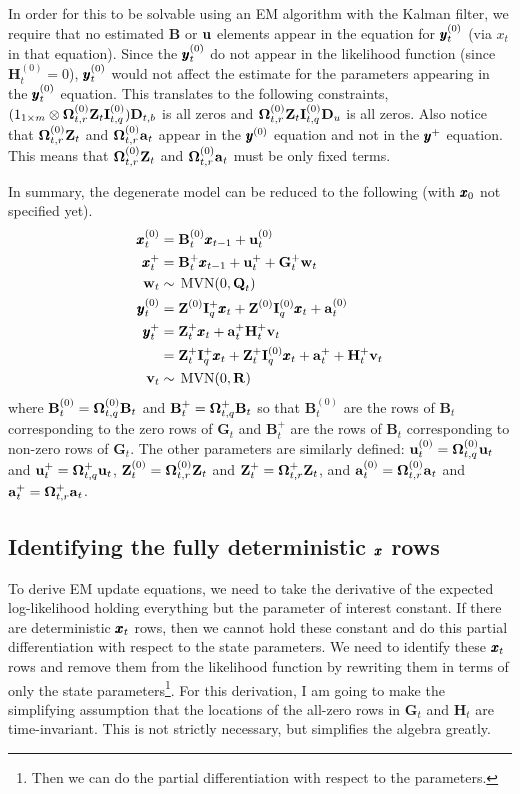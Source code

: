 \documentclass[]{article}
\def\OMG{\mbox{\boldmath $\Omega$}}
\def\UPS{\mbox{\boldmath $\Upsilon$}}
\def\XI{\mbox{\boldmath $\Xi$}}
\def\BB{\mbox{$\mathbf B$}}	\def\bb{\mbox{$\mathbf b$}} \def\Bb{\mbox{$\mathbf J$}} \def\Ba{\mbox{$\mathbf L$}} \def\Bm{\UPS}
\def\DD{\mbox{$\mathbf D$}}	\def\dd{\mbox{$\mathbf d$}}
\def\GG{\mbox{$\mathbf G$}}	\def\gg{\mbox{$\mathbf g$}}
\def\HH{\mbox{$\mathbf H$}}	\def\hh{\mbox{$\mathbf h$}}
\def\II{\mbox{$\mathbf I$}} \def\ii{\mbox{$\mathbf i$}}
\def\MVN{\,\textup{\textrm{MVN}}}
\def\QQ{\mbox{$\mathbf Q$}}	 \def\qq{\mbox{$\mathbf q$}} \def\Qb{\mbox{$\mathbf G$}}  \def\Qm{\mathbb{Q}}
\def\RR{\mbox{$\mathbf R$}}	 \def\rr{\mbox{$\mathbf r$}} \def\Rb{\mbox{$\mathbf H$}}	\def\Rm{\mathbb{R}}
\def\ZZ{\mbox{$\mathbf Z$}}	\def\zz{\mbox{$\mathbf z$}}	\def\Zb{\mbox{$\mathbf M$}} \def\Za{\mbox{$\mathbf N$}} \def\Zm{\XI}
\begin{document}
In order for this to be solvable using an EM algorithm with the Kalman filter, we require that no estimated $\BB$ or $\mbox{$\mathbf u$}$ elements appear in the equation for $\mbox{$\pmb{y}$}_t^{(0)}$ (via $x_t$ in that equation).  Since the $\mbox{$\pmb{y}$}_t^{(0)}$ do not appear in the likelihood function (since $\HH_t^{(0)}=0$), $\mbox{$\pmb{y}$}_t^{(0)}$ would not affect the estimate for the parameters appearing in the $\mbox{$\pmb{y}$}_t^{(0)}$ equation.  This translates to the following constraints, $(1_{1 \times m} \otimes \OMG_{t,r}^{(0)}\ZZ_t\II_{t,q}^{(0)})\DD_{t,b}$ is all zeros and $\OMG_{t,r}^{(0)}\ZZ_t\II_{t,q}^{(0)}\DD_u$ is all zeros.
Also notice that $\OMG_{t,r}^{(0)}\ZZ_t$ and $\OMG_{t,r}^{(0)}\aa_t$ appear in the $\mbox{$\pmb{y}$}^{(0)}$ equation and not in the $\mbox{$\pmb{y}$}^+$ equation.  This means that $\OMG_{t,r}^{(0)}\ZZ_t$ and $\OMG_{t,r}^{(0)}\aa_t$ must be only fixed terms.

In summary, the degenerate model can be reduced to the following (with $\mbox{$\pmb{x}$}_0$ not specified yet).
\begin{equation}\label{eq:degen.model2}
\begin{split}
\xx_t^{(0)}&=\BB_t^{(0)}\xx_{t-1} + \uu_t^{(0)}\\
\xx_t^+&=\BB_t^+\xx_{t-1} + \uu_t^+ + \GG_t^+\ww_t\\
\ww_t &\sim \MVN(0,\QQ_t)
\\
\yy_t^{(0)}&=\ZZ^{(0)}\II_q^+\xx_t + \ZZ^{(0)}\II_q^{(0)}\xx_t + \aa^{(0)}_t\\
\yy_t^+&=\ZZ_t^+\xx_t + \aa_t^+ \HH_t^+\vv_t\\
&=\ZZ_t^+\II_q^+\xx_t + \ZZ_t^+\II_q^{(0)}\xx_t + \aa_t^+ + \HH_t^+\vv_t\\
\vv_t &\sim \MVN(0,\RR)
\end{split}
\end{equation}
where $\BB_t^{(0)}=\OMG_{t,q}^{(0)}\BB_t$ and $\BB_t^+=\OMG_{t,q}^+\BB_t$ so that $\BB_t^{(0)}$ are the rows of $\BB_t$ corresponding to the zero rows of $\GG_t$ and $\BB_t^+$ are the rows of $\BB_t$ corresponding to non-zero rows of  $\GG_t$.  The other parameters are similarly defined: $\uu_t^{(0)}=\OMG_{t,q}^{(0)}\uu_t$  and $\uu_t^+=\OMG_{t,q}^+\uu_t$, $\ZZ_t^{(0)}=\OMG_{t,r}^{(0)}\ZZ_t$  and $\ZZ_t^+=\OMG_{t,r}^+\ZZ_t$, and $\aa_t^{(0)}=\OMG_{t,r}^{(0)}\aa_t$  and $\aa_t^+=\OMG_{t,r}^+\aa_t$.

\subsection{Identifying the fully deterministic $\mbox{$\pmb{x}$}$  rows}\label{sec:ident.xds}
To derive EM update equations, we need to take the derivative of the expected log-likelihood holding everything but the parameter of interest constant.  If there are deterministic $\mbox{$\pmb{x}$}_t$ rows, then we cannot hold these constant and do this partial differentiation with respect to the state parameters.  We need to identify these $\mbox{$\pmb{x}$}_t$ rows and remove them from the likelihood function by rewriting them in terms of only the state parameters\footnote{Then we can do the partial differentiation with respect to the parameters.}. For this derivation, I am going to make the simplifying assumption that the locations of the all-zero rows in $\GG_t$ and $\HH_t$ are time-invariant.  This is not strictly necessary, but simplifies the algebra greatly.
 
\end{document}

